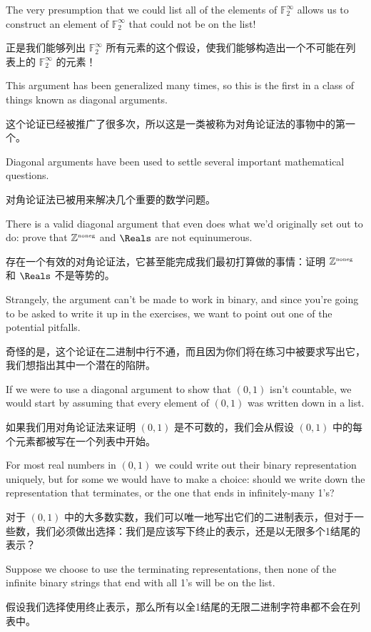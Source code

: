 The very presumption that we could list all of the elements of ${\mathbb F}_2^\infty$
allows us
to construct an element of ${\mathbb F}_2^\infty$ that could not be on the list!

正是我们能够列出 ${\mathbb F}_2^\infty$ 所有元素的这个假设，使我们能够构造出一个不可能在列表上的 ${\mathbb F}_2^\infty$ 的元素！

This argument has been generalized many times, so this is the first in a
class of things known as diagonal arguments.

这个论证已经被推广了很多次，所以这是一类被称为对角论证法的事物中的第一个。

Diagonal arguments have been
used to settle several important mathematical questions.

对角论证法已被用来解决几个重要的数学问题。

There is a valid
diagonal argument that even does what we'd originally set out to do: prove
that ${\mathbb Z}^{\mbox{\tiny noneg}}$  and $\Reals$ are not equinumerous.

存在一个有效的对角论证法，它甚至能完成我们最初打算做的事情：证明 ${\mathbb Z}^{\mbox{\tiny noneg}}$ 和 $\Reals$ 不是等势的。

Strangely, the
argument can't be made to work in binary, and since you're going to be
asked to write it up in the exercises, we want to point out one of the
potential pitfalls.

奇怪的是，这个论证在二进制中行不通，而且因为你们将在练习中被要求写出它，我们想指出其中一个潜在的陷阱。

If we were to use a diagonal argument to show that $(0, 1)$ isn't countable,
we would start by assuming that every element of $(0, 1)$ was written down in
a list.

如果我们用对角论证法来证明 $(0, 1)$ 是不可数的，我们会从假设 $(0, 1)$ 中的每个元素都被写在一个列表中开始。

For most real numbers in $(0, 1)$ we could write out their
binary representation uniquely, but for some we would have to make a
choice: should we write down the representation that terminates, or
the one that ends in infinitely-many 1's?

对于 $(0, 1)$ 中的大多数实数，我们可以唯一地写出它们的二进制表示，但对于一些数，我们必须做出选择：我们是应该写下终止的表示，还是以无限多个1结尾的表示？

Suppose we choose to use
the terminating representations, then none of the infinite binary
strings that end with all 1's will be on the list.

假设我们选择使用终止表示，那么所有以全1结尾的无限二进制字符串都不会在列表中。

